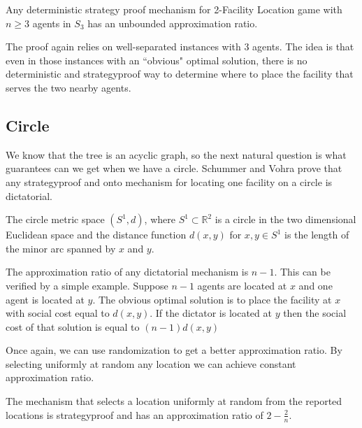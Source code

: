 \begin{theorem}\cite{Fotakis2014}
Any deterministic strategy proof mechanism for 2-Facility Location game with $n\ge3$ agents in $S_3$ has an unbounded approximation ratio.
\end{theorem}

The proof again relies on well-separated instances with 3 agents. The idea is that even in those instances with an ``obvious" optimal solution, there is no deterministic and strategyproof way to determine where to place the facility that serves the two nearby agents.


\subsection{Circle}
We know that the tree is an acyclic graph, so the next natural question is what guarantees can we get when we have a circle. Schummer and Vohra \cite{Schummer2002} prove that any strategyproof and onto mechanism for locating one facility on a circle is dictatorial. 

The circle metric space $(S^1,d)$, where $S^1 \subset \mathbb{R}^2$ is a circle in the two dimensional Euclidean space and the distance function $d(x,y)$ for $x,y \in S^1$ is the length of the minor arc spanned by $x$ and $y$.  


The approximation ratio of any dictatorial mechanism is $n-1$. This can be verified by a simple example. Suppose $n-1$ agents are located at $x$ and one agent is located at $y$. The obvious optimal solution is to place the facility at $x$ with social cost equal to $d(x,y)$. If the dictator is located at $y$ then the social cost of that solution is equal to $(n-1)d(x,y)$  


Once again, we can use randomization to get a better approximation ratio. By selecting uniformly at random any location we can achieve constant approximation ratio.

\begin{definition}
The mechanism that selects a location uniformly at random from the reported locations is strategyproof and has an approximation ratio of $2-\frac{2}{n}$.
\end{definition}

